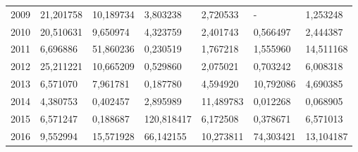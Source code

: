 \begin{table}
\begin{tabular}{p{1cm}p{2cm}p{2cm}p{2cm}p{2cm}p{2cm}p{2cm}}
 2009 &         21,201758 &                                    10,189734 &                  3,803238 &                                 2,720533 &                          - &                         1,253248 \\
 2010 &         20,510631 &                                     9,650974 &                  4,323759 &                                 2,401743 &                   0,566497 &                         2,444387 \\
 2011 &          6,696886 &                                    51,860236 &                  0,230519 &                                 1,767218 &                   1,555960 &                        14,511168 \\
 2012 &         25,211221 &                                    10,665209 &                  0,529860 &                                 2,075021 &                   0,703242 &                         6,008318 \\
 2013 &          6,571070 &                                     7,961781 &                  0,187780 &                                 4,594920 &                  10,792086 &                         4,690385 \\
 2014 &          4,380753 &                                     0,402457 &                  2,895989 &                                11,489783 &                   0,012268 &                         0,068905 \\
 2015 &          6,571247 &                                     0,188687 &                120,818417 &                                 6,172508 &                   0,378671 &                         6,571013 \\
 2016 &          9,552994 &                                    15,571928 &                 66,142155 &                                10,273811 &                  74,303421 &                        13,104187 \\
\bottomrule
\end{tabular}
\end{table}
